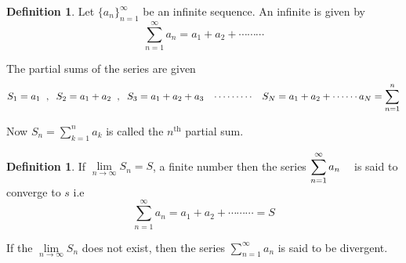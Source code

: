 \documentclass[11pt,a4paper]{article}
\theoremstyle{definition}
\newtheorem{defn}[thm]{Definition}
\begin{document}
\begin{defn}


Let $\{a_n\}^{\infty}_{n=1}$ be an infinite sequence. An infinite is given by $$\sum^{\infty}_{n=1}a_n = a_1 + a_2 + \cdots\cdots\cdots$$

The partial sums of the series are given $$S_1 = a_1\hspace{0.2cm} , \hspace{0.2cm} S_2 = a_1 + a_2\hspace{0.2cm} , \hspace{0.2cm} S_3 = a_1 + a_2 + a_3\hspace{0.3cm} \cdots\cdots\cdots\hspace{0.3cm} S_N = a_1 + a_2 + \cdots\cdots a_N = \sum^n_{n=1}$$

Now $\displaystyle{S_n = \sum^n_{k=1}a_k}$ is called the $n^{\text{th}}$ partial sum.
\end{defn}


\begin{defn}


If $\lim\limits_{n \rightarrow \infty} S_n = S$, a finite number then the series $\displaystyle{\sum^{\infty}_{n=1}a_n}\hspace{0.3cm}$ is said to converge to $s$ i.e $$\sum^{\infty}_{n=1}a_n = a_1 + a_2 + \cdots\cdots\cdots = S$$

If the $\lim\limits_{n \rightarrow \infty} S_n $ does not exist, then the series $\displaystyle{\sum^{\infty}_{n=1}a_n}$ is said to be divergent.
\end{defn}
\end{document}
